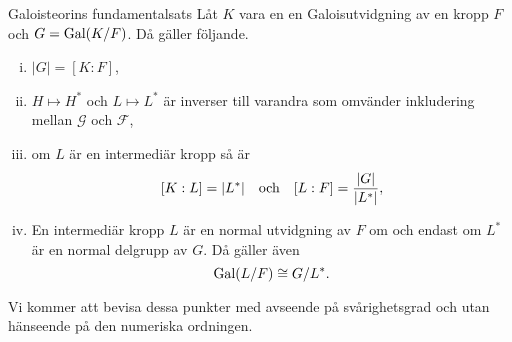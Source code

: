 \documentclass{article}
\newcommand{\gal}[0]{\textnormal{Gal}}
\theoremstyle{definition}
\begin{document}
\begin{mytheo}{Galoisteorins fundamentalsats}{}
  Låt $K$ vara en en Galoisutvidgning av en kropp $F$ och $G = \gal(K/F)$. Då gäller följande.
  \begin{enumerate}[(i)]
    \item $|G| = [K:F]$,
    \item $H \mapsto H^*$ och $L \mapsto L^*$ är inverser till varandra som omvänder inkludering mellan $\mathcal{G}$ och $\mathcal{F}$,
    \item om $L$ är en intermediär kropp så är 
    \[ [K:L] = |L^*| \quad \textnormal{och} \quad [L:F] = \frac{|G|}{|L^*|}, \]
    \item En intermediär kropp $L$ är en normal utvidgning av $F$ om och endast om $L^*$ är en normal delgrupp av $G$. Då gäller även 
    \[ \gal(L/F) \cong G/L^*. \]
  \end{enumerate}
\end{mytheo}
Vi kommer att bevisa dessa punkter med avseende på svårighetsgrad och utan hänseende på den numeriska ordningen. 
\end{document}
